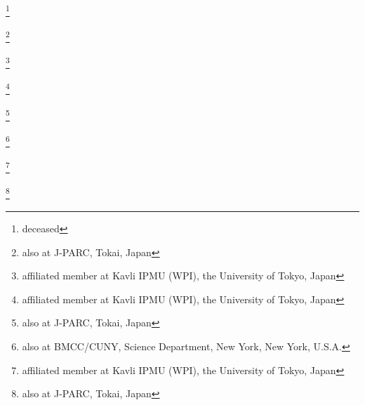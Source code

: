 \documentclass[%
 reprint,
superscriptaddress,
 amsmath,amssymb,
 aps,
]{revtex4-1}
\begin{document}
\author{S.\,Tobayama}\INSTD
\author{W.\,Toki}\INSTFG
\author{T.\,Tomura}\INSTBJ
\author{Y.\,Totsuka}\thanks{deceased}\noaffiliation
\author{C.\,Touramanis}\INSTFC
\author{T.\,Tsukamoto}\thanks{also at J-PARC, Tokai, Japan}\INSTCB
\author{M.\,Tzanov}\INSTFI
\author{Y.\,Uchida}\INSTEI
\author{A.\,Vacheret}\INSTGG
\author{M.\,Vagins}\INSTHA\INSTGA
\author{G.\,Vasseur}\INSTI
\author{T.\,Wachala}\INSTDG
\author{K.\,Wakamatsu}\INSTCF
\author{C.W.\,Walter}\thanks{affiliated member at Kavli IPMU (WPI), the University of Tokyo, Japan}\INSTFH
\author{D.\,Wark}\INSTEH\INSTGG
\author{W.\,Warzycha}\INSTDJ
\author{M.O.\,Wascko}\INSTEI
\author{A.\,Weber}\INSTEH\INSTGG
\author{R.\,Wendell}\thanks{affiliated member at Kavli IPMU (WPI), the University of Tokyo, Japan}\INSTBJ
\author{R.J.\,Wilkes}\INSTGE
\author{M.J.\,Wilking}\INSTFJ
\author{C.\,Wilkinson}\INSTFB
\author{Z.\,Williamson}\INSTGG
\author{J.R.\,Wilson}\INSTFA
\author{R.J.\,Wilson}\INSTFG
\author{T.\,Wongjirad}\INSTFH
\author{Y.\,Yamada}\thanks{also at J-PARC, Tokai, Japan}\INSTCB
\author{K.\,Yamamoto}\INSTCF
\author{C.\,Yanagisawa}\thanks{also at BMCC/CUNY, Science Department, New York, New York, U.S.A.}\INSTFJ
\author{T.\,Yano}\INSTCC
\author{S.\,Yen}\INSTB
\author{N.\,Yershov}\INSTEB
\author{M.\,Yokoyama}\thanks{affiliated member at Kavli IPMU (WPI), the University of Tokyo, Japan}\INSTCH
\author{J.\,Yoo}\INSTFI
\author{K.\,Yoshida}\INSTCD
\author{T.\,Yuan}\INSTGB
\author{M.\,Yu}\INSTH
\author{A.\,Zalewska}\INSTDG
\author{J.\,Zalipska}\INSTDF
\author{L.\,Zambelli}\thanks{also at J-PARC, Tokai, Japan}\INSTCB
\author{K.\,Zaremba}\INSTDH
\author{M.\,Ziembicki}\INSTDH
\author{E.D.\,Zimmerman}\INSTGB
\author{M.\,Zito}\INSTI
\author{J.\,\.Zmuda}\INSTEA

\noaffiliation


\date{\today}%
\end{document}
